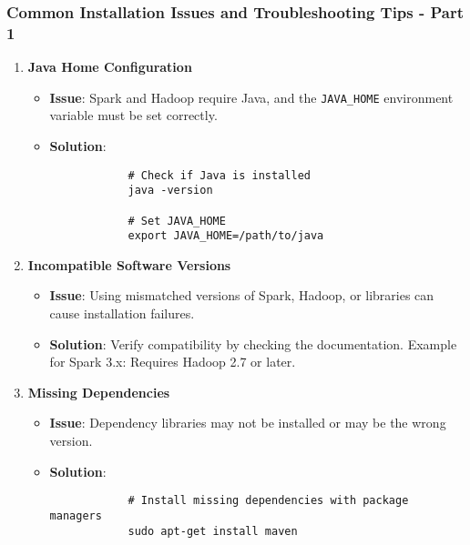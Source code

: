 \documentclass{beamer}
\begin{document}
\begin{frame}[fragile]
    \frametitle{Common Installation Issues and Troubleshooting Tips - Part 1}
    \begin{enumerate}
        \item \textbf{Java Home Configuration}
        \begin{itemize}
            \item \textbf{Issue}: Spark and Hadoop require Java, and the \texttt{JAVA\_HOME} environment variable must be set correctly.
            \item \textbf{Solution}:
            \begin{lstlisting}
            # Check if Java is installed
            java -version
            
            # Set JAVA_HOME
            export JAVA_HOME=/path/to/java
            \end{lstlisting}
        \end{itemize}
        
        \item \textbf{Incompatible Software Versions}
        \begin{itemize}
            \item \textbf{Issue}: Using mismatched versions of Spark, Hadoop, or libraries can cause installation failures.
            \item \textbf{Solution}: Verify compatibility by checking the documentation. Example for Spark 3.x: Requires Hadoop 2.7 or later.
        \end{itemize}
        
        \item \textbf{Missing Dependencies}
        \begin{itemize}
            \item \textbf{Issue}: Dependency libraries may not be installed or may be the wrong version.
            \item \textbf{Solution}:
            \begin{lstlisting}
            # Install missing dependencies with package managers
            sudo apt-get install maven
            \end{lstlisting}
        \end{itemize}
    \end{enumerate}
\end{frame}
\end{document}
